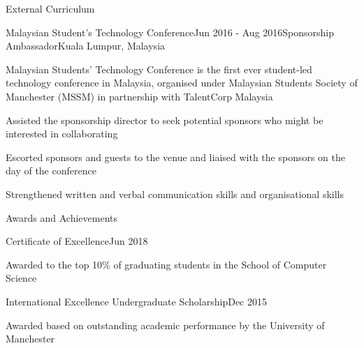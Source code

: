 \documentclass{techresume} %
\begin{document}
\begin{rSection}{External Curriculum}
\begin{rSubsection}{Malaysian Student's Technology Conference}{Jun 2016 - Aug 2016}{Sponsorship Ambassador}{Kuala Lumpur, Malaysia}
\item Malaysian Students’ Technology Conference is the first ever student-led technology conference in Malaysia, organised under Malaysian Students Society of Manchester (MSSM) in partnership with TalentCorp Malaysia
\item Assisted the sponsorship director to seek potential sponsors who might be interested in collaborating
\item Escorted sponsors and guests to the venue and liaised with the sponsors on the day of the conference
\item Strengthened written and verbal communication skills and organisational skills
\end{rSubsection}

\end{rSection}


\begin{rSection}{Awards and Achievements}

\begin{rSubsection}{Certificate of Excellence}{Jun 2018}{}{}
\item[] Awarded to the top 10\% of graduating students in the School of Computer Science
\end{rSubsection}

\begin{rSubsection}{International Excellence Undergraduate Scholarship}{Dec 2015}{}{}
\item[] Awarded based on outstanding academic performance by the University of Manchester
\end{rSubsection}

\end{rSection}

\end{document}
